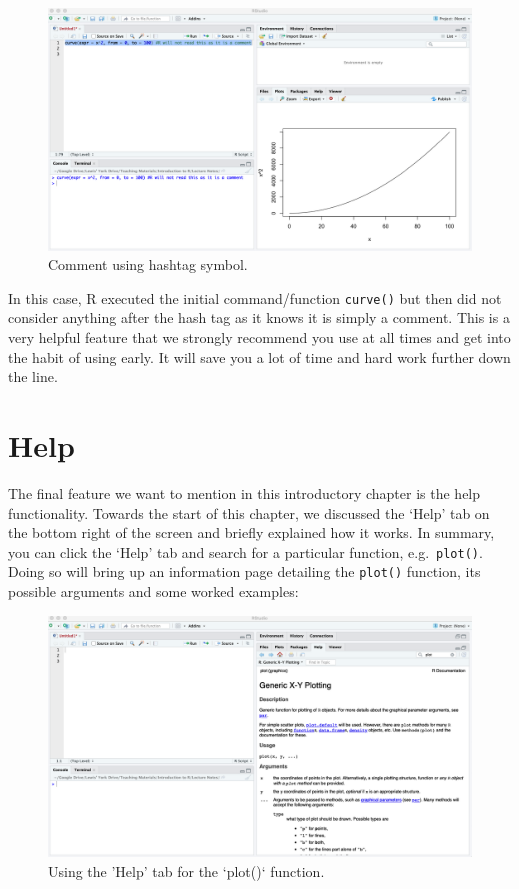 \documentclass[
]{book}
\theoremstyle{definition}
\theoremstyle{definition}
\theoremstyle{definition}
\theoremstyle{definition}
\theoremstyle{remark}
\begin{document}
\begin{figure}

{\centering \includegraphics[width=0.7\linewidth]{Figures/comment} 

}

\caption{Comment using hashtag symbol.}\label{fig:comment2}
\end{figure}

In this case, R executed the initial command/function \texttt{curve()} but then did not consider anything after the hash tag as it knows it is simply a comment. This is a very helpful feature that we strongly recommend you use at all times and get into the habit of using early. It will save you a lot of time and hard work further down the line.

\hypertarget{help}{%
\section*{Help}\label{help}}

The final feature we want to mention in this introductory chapter is the help functionality. Towards the start of this chapter, we discussed the `Help' tab on the bottom right of the screen and briefly explained how it works. In summary, you can click the `Help' tab and search for a particular function, e.g.~\texttt{plot()}. Doing so will bring up an information page detailing the \texttt{plot()} function, its possible arguments and some worked examples:

\begin{figure}

{\centering \includegraphics[width=0.7\linewidth]{Figures/Help} 

}

\caption{Using the 'Help' tab for the `plot()` function.}\label{fig:help}
\end{figure}
\end{document}
